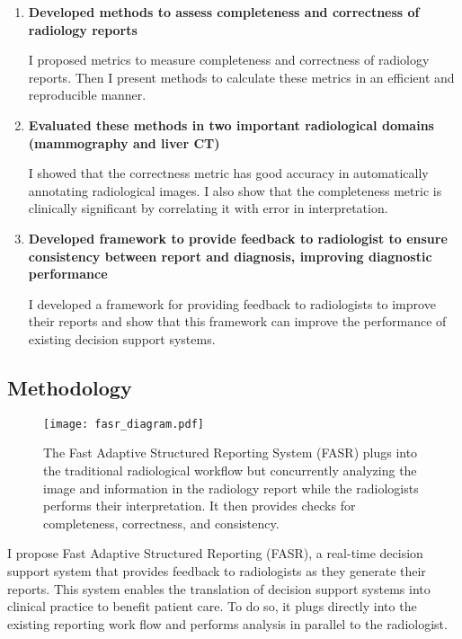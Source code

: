 \begin{enumerate}
	\item \textbf{Developed methods to assess completeness and correctness of radiology reports}
	
	I proposed metrics to measure completeness and correctness of radiology reports. Then I present methods to calculate these metrics in an efficient and reproducible manner.
	
	\item \textbf{Evaluated these methods in two important radiological domains (mammography and liver CT)}
	
	I showed that the correctness metric has good accuracy in automatically annotating radiological images. I also show that the completeness metric is clinically significant by correlating it with error in interpretation.
	
	\item \textbf{Developed framework to provide feedback to radiologist to ensure consistency between report and diagnosis, improving diagnostic performance}
	
	I developed a framework for providing feedback to radiologists to improve their reports and show that this framework can improve the performance of existing decision support systems.
\end{enumerate}

\subsection{Methodology}

\begin{figure}[h]
	\centering
	\texttt{[image: fasr\_diagram.pdf]}
	\caption[Overview of the Fast Adaptive Structured Reporting (FASR) system]{The Fast Adaptive Structured Reporting System (FASR) plugs into the traditional radiological workflow but concurrently analyzing the image and information in the radiology report while the radiologists performs their interpretation. It then provides checks for completeness, correctness, and consistency.}
	\label{fig:fasr_diagram}
\end{figure}

I propose Fast Adaptive Structured Reporting (FASR), a real-time decision support system that provides feedback to radiologists as they generate their reports. This system enables the translation of decision support systems into clinical practice to benefit patient care. To do so, it plugs directly into the existing reporting work flow and performs analysis in parallel to the radiologist.

